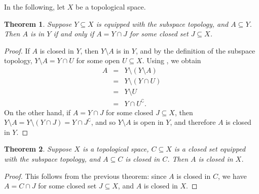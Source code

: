 \documentclass[12pt]{article}
\newtheorem{thm}{Theorem}
\begin{document}


In the following, let $X$ be a topological space. 

\begin{thm}
Suppose $Y\subseteq X$ is equipped with the subspace topology,
and $A\subseteq Y$.
Then $A$ is  in $Y$ if and only if
$A=Y\cap J$ for some closed set $J\subseteq X$.
\end{thm}

\begin{proof} 
If $A$ is closed in $Y$,
then $Y\setminus A$ is  in $Y$, 
and by the definition of the subspace topology,
$Y\setminus A = Y\cap U$ for some open $U\subseteq X$. 
Using , 
we obtain
\begin{eqnarray*}
  A &=& Y\setminus (Y\setminus A) \\
    &=& Y\setminus(Y\cap U) \\
    &=& Y\setminus U \\
    &=& Y\cap U^\complement.
\end{eqnarray*}
On the other hand, if $A=Y\cap J$ for some closed $J\subseteq X$,
then $Y\setminus A = Y\setminus(Y\cap J) = Y\cap J^\complement$,
and so $Y\setminus A$ is open in $Y$,
and therefore $A$ is closed in $Y$.
\end{proof}

\begin{thm}
Suppose $X$ is a topological space, $C\subseteq X$ 
is a closed set equipped with the subspace topology, 
and $A\subseteq C$ is closed in $C$. 
Then $A$ is closed in $X$. 
\end{thm}

\begin{proof} This follows from the previous theorem:
since $A$ is closed in $C$, 
we have $A = C\cap J$ for some closed set $J\subseteq X$,
and $A$ is closed in $X$.
\end{proof}
\end{document}
